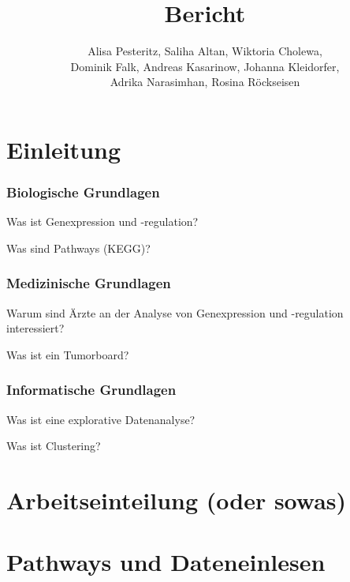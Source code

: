 \documentclass[12pt]{article}
\title{Bericht}
\author{Alisa Pesteritz, Saliha Altan, Wiktoria Cholewa, \\ 
	Dominik Falk, Andreas Kasarinow, Johanna Kleidorfer, \\
	Adrika Narasimhan, Rosina Röckseisen}
\begin{document}
\newpage
\maketitle

\newpage
\pagestyle{fancy}
\fancyhead{}
\section{Einleitung}
\label{einleitung}


\label{grundlagen}

\subsubsection{Biologische Grundlagen}
\label{bio-grundlagen}
Was ist Genexpression und -regulation?

Was sind Pathways (KEGG)?

\subsubsection{Medizinische Grundlagen}
\label{medizin-grundlagen}
Warum sind Ärzte an der Analyse von Genexpression und -regulation interessiert?

Was ist ein Tumorboard?

\subsubsection{Informatische Grundlagen}
\label{info-grundlagen}
Was ist eine explorative Datenanalyse?

Was ist Clustering?


\section{Arbeitseinteilung (oder sowas)}
\label{arbeitseinteilung}

\newpage
\pagestyle{fancy}
\fancyhead{}
\section{Pathways und Dateneinlesen}
\label{pathways}

\newpage
\pagestyle{fancy}
\fancyhead{}
\end{document}
